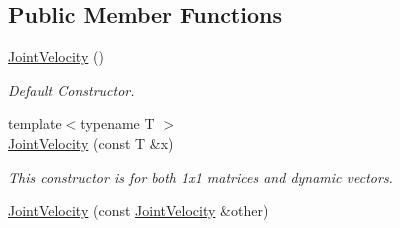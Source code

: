 \subsection*{Public Member Functions}
\begin{DoxyCompactItemize}
\item 
\hyperlink{classow__core_1_1JointVelocity_a4441b48524439cbd670908be707c3ed8}{Joint\+Velocity} ()\hypertarget{classow__core_1_1JointVelocity_a4441b48524439cbd670908be707c3ed8}{}\label{classow__core_1_1JointVelocity_a4441b48524439cbd670908be707c3ed8}

\begin{DoxyCompactList}\small\item\em Default Constructor. \end{DoxyCompactList}\item 
{\footnotesize template$<$typename T $>$ }\\\hyperlink{classow__core_1_1JointVelocity_a7a647004801bc8044c0c3715bbf66561}{Joint\+Velocity} (const T \&x)\hypertarget{classow__core_1_1JointVelocity_a7a647004801bc8044c0c3715bbf66561}{}\label{classow__core_1_1JointVelocity_a7a647004801bc8044c0c3715bbf66561}

\begin{DoxyCompactList}\small\item\em This constructor is for both 1x1 matrices and dynamic vectors. \end{DoxyCompactList}\item 
\hyperlink{classow__core_1_1JointVelocity_ae6f581f7d4459e1f538b59533a8679a5}{Joint\+Velocity} (const \hyperlink{classow__core_1_1JointVelocity}{Joint\+Velocity} \&other)\hypertarget{classow__core_1_1JointVelocity_ae6f581f7d4459e1f538b59533a8679a5}{}\label{classow__core_1_1JointVelocity_ae6f581f7d4459e1f538b59533a8679a5}


\end{DoxyCompactItemize}

